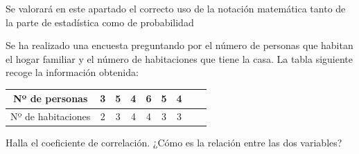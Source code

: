 \documentclass[addpoints,spanish, 12pt,a4paper]{exam}
\begin{document}
\begin{questions}

\question[1] Se valorará en este apartado el correcto uso de la notación matemática tanto de la parte de estadística como de probabilidad

\question[1]  Se ha realizado una encuesta preguntando por el número de personas que habitan el hogar familiar y el número de habitaciones que tiene la casa. La tabla siguiente recoge la información obtenida:

\begin{tabular}{|c||c|c|c|c|c|c|c|c|}
\hline 
Nº de personas & 3 & 5 & 4 & 6 & 5 & 4  \\ 
\hline 
Nº de habitaciones & 2 & 3 & 4 & 4 & 3 & 3 \\ 
\hline 
\end{tabular} 

Halla el coeficiente de correlación. ¿Cómo es la relación entre las dos variables?


\end{questions}
\end{document}

